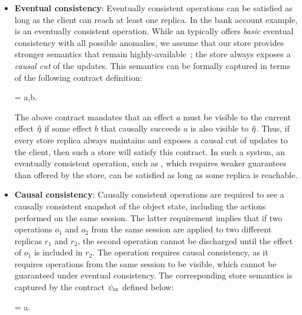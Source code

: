 \begin{itemize}

\item \textbf{Eventual consistency}: Eventually consistent operations can
	be satisfied as long as the client can reach at least one replica. In the
	bank account example,  is an eventually consistent operation.
	While an \ecds typically offers \emph{basic} eventual consistency with all
	possible anomalies, we assume that our store provides stronger semantics that
	remain highly-available~\cite{BailisHAT,COPS}; the store always exposes a
	\emph{causal cut} of the updates. This semantics can be formally captured in
	terms of the following contract definition:

  \vspace{-1mm}
  \begin{cmathpar}
  \ecc = \forall a,b. ~ \wedge {} \Rightarrow {}
  \end{cmathpar}

  The above contract mandates that an effect $a$ must be visible to the current
  effect $\hat{\eta}$ if some effect $b$ that causally succeeds $a$ is also visible
  to $\hat{\eta}$. Thus, if every store replica always maintains and exposes a
  causal cut of updates to the client, then such a store will satisfy this
  contract. In such a system, an eventually consistent operation, such as
  , which requires weaker guarantees than offered by the store, can
  be satisfied as long as some replica is reachable.

\item \textbf{Causal consistency}: Causally consistent operations are required
	to see a causally consistent snapshot of the object state, including the
	actions performed on the same session.  The latter requirement implies that
	if two operations $o_1$ and $o_2$ from the same session are applied to two
	different replicas $r_1$ and $r_2$, the second operation cannot be discharged
	until the effect of $o_1$ is included in $r_2$. The  operation
	requires causal consistency, as it requires operations from the same
	session to be visible, which cannot be guaranteed under eventual consistency.
	The corresponding store semantics is captured by the contract $\psi_{\sf cc}$ defined
	below:

  \vspace{-1mm}
  \begin{cmathpar}
  \ccc = \forall a.~ \Rightarrow {}
  \end{cmathpar}


\end{itemize}
